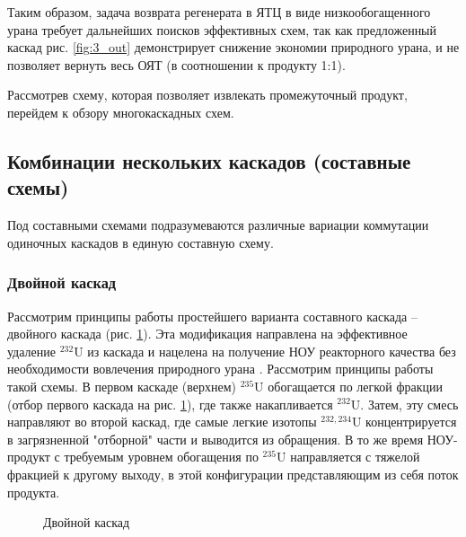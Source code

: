 Таким образом, задача возврата регенерата в ЯТЦ в виде низкообогащенного урана требует дальнейших поисков эффективных схем, так как предложенный каскад рис. \ref{fig:3_out} демонстрирует снижение экономии природного урана, и не позволяет вернуть весь ОЯТ (в соотношении к продукту 1:1).

Рассмотрев схему, которая позволяет извлекать промежуточный продукт, перейдем к обзору многокаскадных схем.


\subsection{Комбинации нескольких каскадов (составные схемы)}\label{sec:ch1/sec2.3}
Под составными схемами подразумеваются различные вариации коммутации одиночных каскадов в единую составную схему.

\subsubsection{Двойной каскад}

Рассмотрим принципы работы простейшего варианта составного каскада -- двойного каскада (рис. \ref{fig:double_ru}).
Эта модификация направлена на эффективное удаление $^{232}$U из каскада и нацелена на получение НОУ реакторного качества без необходимости вовлечения природного урана \cite{SosninYuChelcov, TehnicheskieResheniyaPo}.
Рассмотрим принципы работы такой схемы.
В первом каскаде (верхнем) $^{235}$U обогащается по легкой фракции (отбор первого каскада на рис. \ref{fig:double_ru}), где также накапливается $^{232}$U.
Затем, эту смесь направляют во второй каскад, где самые легкие изотопы $^{232,234}$U концентрируется в загрязненной "отборной" части и выводится из обращения.
В то же время НОУ-продукт с требуемым уровнем обогащения по $^{235}$U направляется с тяжелой фракцией к другому выходу, в этой конфигурации представляющим из себя поток продукта.
\begin{figure}[ht]
  \caption{Двойной каскад}\label{fig:double_ru}
\end{figure}

